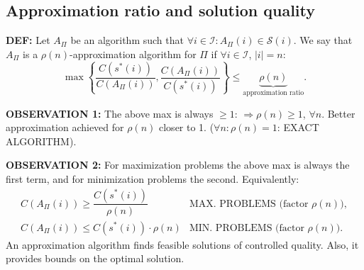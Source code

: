 \subsection{Approximation ratio and solution quality}
\begin{notesdefinition}
\textbf{DEF:} Let $A_\Pi$ be an algorithm such that $\forall i\in\mathcal I:A_\Pi(i)\in\mathcal S(i)$. We say that $A_\Pi$ is a $\rho(n)$-approximation algorithm for $\Pi$ if $\forall i\in\mathcal I$, $|i|=n$:
\[\max\left\{\frac{C(s^*(i))}{C(A_\Pi(i))},\frac{C(A_\Pi(i))}{C(s^*(i))}\right\}
\leq\underbrace{\rho(n)}_{\text{approximation ratio}}.\]
\end{notesdefinition}

\textbf{OBSERVATION 1:} The above max is always $\geq1$:
$\Rightarrow\rho(n)\geq1$, $\forall n$. Better approximation achieved for $\rho(n)$ closer to 1. ($\forall n:\rho(n)=1$: EXACT ALGORITHM).

\textbf{OBSERVATION 2:} For maximization problems the above max is always the first term, and for minimization problems the second. Equivalently:
\[
\begin{array}{ll}
C(A_\Pi(i))\geq\dfrac{C(s^*(i))}{\rho(n)}&\text{MAX. PROBLEMS (factor $\rho(n)$)},\\[8pt]
C(A_\Pi(i))\leq C(s^*(i))\cdot\rho(n)&\text{MIN. PROBLEMS (factor $\rho(n)$)}.
\end{array}
\]
An approximation algorithm finds feasible solutions of controlled quality. Also, it provides bounds on the optimal solution.
